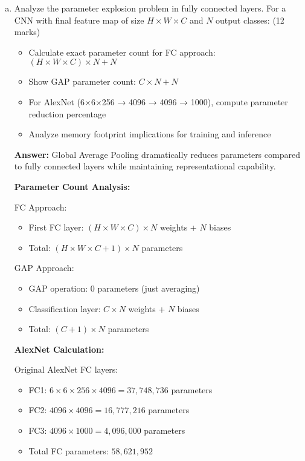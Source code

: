 \documentclass[12pt]{article}
\newcommand{\answer}[1]{{\color{answercolor}\textbf{Answer:} #1}}
\newcommand{\explanation}[1]{{\color{explanationcolor}#1}}
\begin{document}
\begin{enumerate}[(a)]
    \item Analyze the parameter explosion problem in fully connected layers. For a CNN with final feature map of size $H \times W \times C$ and $N$ output classes: \hfill (12 marks)
    \begin{itemize}
        \item Calculate exact parameter count for FC approach: $(H \times W \times C) \times N + N$
        \item Show GAP parameter count: $C \times N + N$
        \item For AlexNet (6×6×256 → 4096 → 4096 → 1000), compute parameter reduction percentage
        \item Analyze memory footprint implications for training and inference
    \end{itemize}
    
    \answer{Global Average Pooling dramatically reduces parameters compared to fully connected layers while maintaining representational capability.}
    
    \explanation{
    \textbf{Parameter Count Analysis:}
    
    FC Approach:
    \begin{itemize}
        \item First FC layer: $(H \times W \times C) \times N$ weights + $N$ biases
        \item Total: $(H \times W \times C + 1) \times N$ parameters
    \end{itemize}
    
    GAP Approach:
    \begin{itemize}
        \item GAP operation: 0 parameters (just averaging)
        \item Classification layer: $C \times N$ weights + $N$ biases
        \item Total: $(C + 1) \times N$ parameters
    \end{itemize}
    
    \textbf{AlexNet Calculation:}
    
    Original AlexNet FC layers:
    \begin{itemize}
        \item FC1: $6 \times 6 \times 256 \times 4096 = 37,748,736$ parameters
        \item FC2: $4096 \times 4096 = 16,777,216$ parameters  
        \item FC3: $4096 \times 1000 = 4,096,000$ parameters
        \item Total FC parameters: $58,621,952$
    \end{itemize}
    
}
\end{enumerate}
\end{document}
